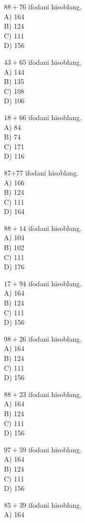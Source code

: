   \item $88+76$ ifodani hisoblang.\\
A) 164\\
B) 124\\
C) 111\\
D) 156
  \item $43+65$ ifodani hisoblang.\\
A) 144\\
B) 135\\
C) 108\\
D) 106
  \item $18+66$ ifodani hisoblang.\\
A) 84\\
B) 74\\
C) 171\\
D) 116
  \item 87+77 ifodani hisoblang.\\
A) 166\\
B) 124\\
C) 111\\
D) 164
  \item $88+14$ ifodani hisoblang.\\
A) 104\\
B) 102\\
C) 111\\
D) 176
  \item $17+94$ ifodani hisoblang.\\
A) 164\\
B) 124\\
C) 111\\
D) 156
  \item $98+26$ ifodani hisoblang.\\
A) 164\\
B) 124\\
C) 111\\
D) 156
  \item $88+23$ ifodani hisoblang.\\
A) 164\\
B) 124\\
C) 111\\
D) 156
  \item $97+59$ ifodani hisoblang.\\
A) 164\\
B) 124\\
C) 111\\
D) 156
  \item $85+39$ ifodani hisoblang.\\
A) 164\\
